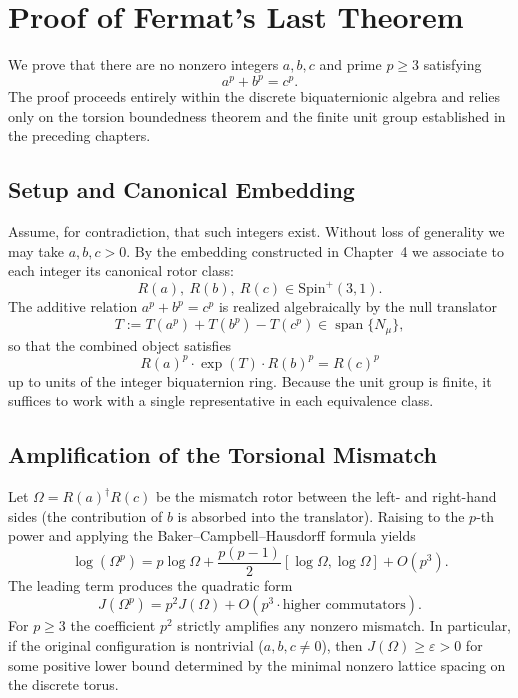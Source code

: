 \documentclass[dvipdfmx,a4paper]{article}
\theoremstyle{definition}
\theoremstyle{remark}
\begin{document}
\section{Proof of Fermat's Last Theorem}

We prove that there are no nonzero integers \( a, b, c \) and prime \( p \geq 3 \) satisfying
\[
a^p + b^p = c^p.
\]
The proof proceeds entirely within the discrete biquaternionic algebra and relies only on the torsion boundedness theorem and the finite unit group established in the preceding chapters.

\subsection{Setup and Canonical Embedding}

Assume, for contradiction, that such integers exist. Without loss of generality we may take \( a, b, c > 0 \). By the embedding constructed in Chapter~4 we associate to each integer its canonical rotor class:
\[
R(a),\ R(b),\ R(c) \in \mathrm{Spin}^+(3,1).
\]
The additive relation \( a^p + b^p = c^p \) is realized algebraically by the null translator
\[
T := T(a^p) + T(b^p) - T(c^p) \in \operatorname{span}\{N_\mu\},
\]
so that the combined object satisfies
\[
R(a)^p \cdot \exp(T) \cdot R(b)^p = R(c)^p
\]
up to units of the integer biquaternion ring. Because the unit group is finite, it suffices to work with a single representative in each equivalence class.

\subsection{Amplification of the Torsional Mismatch}

Let \( \Omega = R(a)^\dagger R(c) \) be the mismatch rotor between the left- and right-hand sides (the contribution of \( b \) is absorbed into the translator). Raising to the \( p \)-th power and applying the Baker--Campbell--Hausdorff formula yields
\[
\log(\Omega^p) = p \log \Omega + \frac{p(p-1)}{2} [\log \Omega, \log \Omega] + O(p^3).
\]
The leading term produces the quadratic form
\[
J(\Omega^p) = p^2 J(\Omega) + O(p^3 \cdot \text{higher commutators}).
\]
For \( p \geq 3 \) the coefficient \( p^2 \) strictly amplifies any nonzero mismatch. In particular, if the original configuration is nontrivial (\( a,b,c \neq 0 \)), then \( J(\Omega) \geq \varepsilon > 0 \) for some positive lower bound determined by the minimal nonzero lattice spacing on the discrete torus.
\end{document}
